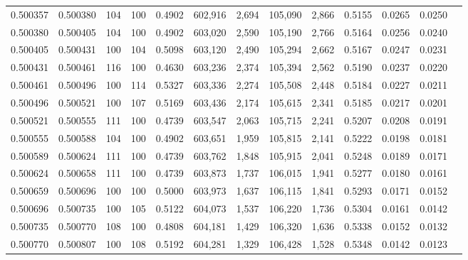\begin{tabular}{rrrrrrrrrrrrr}
0.500357 & 0.500380 &   104 & 100 &                                     0.4902 & 602,916 &   2,694 & 105,090 &   2,866 & 0.5155 & 0.0265 & 0.0250 \\
0.500380 & 0.500405 &   104 & 100 &                                     0.4902 & 603,020 &   2,590 & 105,190 &   2,766 & 0.5164 & 0.0256 & 0.0240 \\
0.500405 & 0.500431 &   100 & 104 &                                     0.5098 & 603,120 &   2,490 & 105,294 &   2,662 & 0.5167 & 0.0247 & 0.0231 \\
0.500431 & 0.500461 &   116 & 100 &                                     0.4630 & 603,236 &   2,374 & 105,394 &   2,562 & 0.5190 & 0.0237 & 0.0220 \\
0.500461 & 0.500496 &   100 & 114 &                                     0.5327 & 603,336 &   2,274 & 105,508 &   2,448 & 0.5184 & 0.0227 & 0.0211 \\
0.500496 & 0.500521 &   100 & 107 &                                     0.5169 & 603,436 &   2,174 & 105,615 &   2,341 & 0.5185 & 0.0217 & 0.0201 \\
0.500521 & 0.500555 &   111 & 100 &                                     0.4739 & 603,547 &   2,063 & 105,715 &   2,241 & 0.5207 & 0.0208 & 0.0191 \\
0.500555 & 0.500588 &   104 & 100 &                                     0.4902 & 603,651 &   1,959 & 105,815 &   2,141 & 0.5222 & 0.0198 & 0.0181 \\
0.500589 & 0.500624 &   111 & 100 &                                     0.4739 & 603,762 &   1,848 & 105,915 &   2,041 & 0.5248 & 0.0189 & 0.0171 \\
0.500624 & 0.500658 &   111 & 100 &                                     0.4739 & 603,873 &   1,737 & 106,015 &   1,941 & 0.5277 & 0.0180 & 0.0161 \\
0.500659 & 0.500696 &   100 & 100 &                                     0.5000 & 603,973 &   1,637 & 106,115 &   1,841 & 0.5293 & 0.0171 & 0.0152 \\
0.500696 & 0.500735 &   100 & 105 &                                     0.5122 & 604,073 &   1,537 & 106,220 &   1,736 & 0.5304 & 0.0161 & 0.0142 \\
0.500735 & 0.500770 &   108 & 100 &                                     0.4808 & 604,181 &   1,429 & 106,320 &   1,636 & 0.5338 & 0.0152 & 0.0132 \\
0.500770 & 0.500807 &   100 & 108 &                                     0.5192 & 604,281 &   1,329 & 106,428 &   1,528 & 0.5348 & 0.0142 & 0.0123 \\

\end{tabular}
